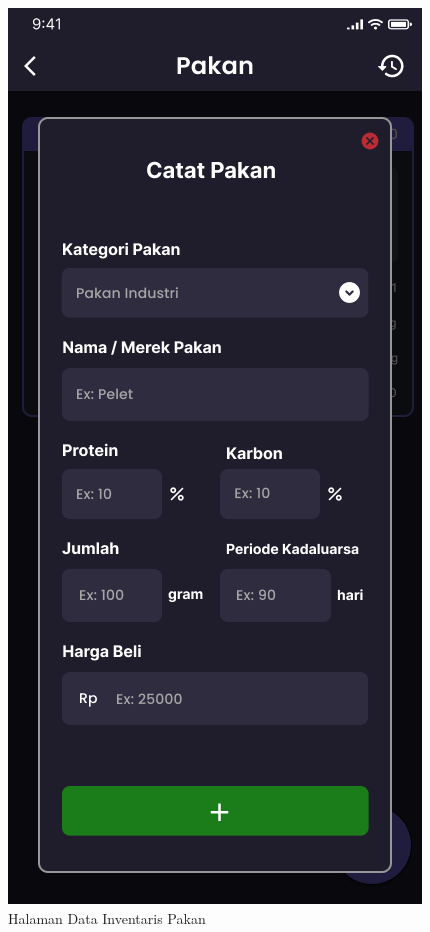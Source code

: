 \begin{enumerate}
\begin{enumerate}
\begin{figure}[H]
			  \caption{Halaman Data Inventaris Pakan}
			\endminipage\hfill
			  \includegraphics[width=\linewidth]{gambar/sprint1/mockup_input_feed.png}

\end{figure}
\end{enumerate}
\end{enumerate}
